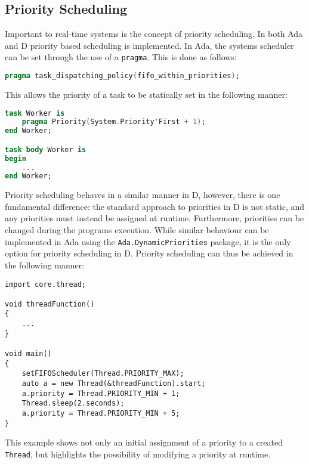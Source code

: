 \subsection{Priority Scheduling}
Important to real-time systems is the concept of priority scheduling. In both
Ada and D priority based scheduling is implemented. In Ada, the systems scheduler can
be set through the use of a \texttt{pragma}. This is done as follows: 
\begin{lstlisting}[basicstyle=\small,language=Ada]
pragma task_dispatching_policy(fifo_within_priorities); 
\end{lstlisting}
This allows the priority of a task to be statically set in the following manner: 
\begin{lstlisting}[basicstyle=\small,language=Ada]
task Worker is 
    pragma Priority(System.Priority'First + 1); 
end Worker;

task body Worker is 
begin 
    ...
end Worker; 
\end{lstlisting}
Priority scheduling behaves in a similar manner in D, however, there is one
fundamental difference: the standard approach to priorities in D is not static, 
and any priorities must instead be assigned at runtime. 
Furthermore, priorities can be changed during the programs execution. While similar
behaviour can be implemented in Ada using the
\texttt{Ada.Dynamic\textunderscore{}Priorities}
package, it is the only option for priority scheduling in D. 
Priority scheduling can thus be achieved in the following manner: 
\begin{lstlisting}[basicstyle=\small]
import core.thread; 

void threadFunction()
{
    ...
}

void main()
{
    setFIFOScheduler(Thread.PRIORITY_MAX);
    auto a = new Thread(&threadFunction).start;
    a.priority = Thread.PRIORITY_MIN + 1; 
    Thread.sleep(2.seconds); 
    a.priority = Thread.PRIORITY_MIN + 5; 
}
\end{lstlisting}
This example shows not only an initial assignment of a priority to a created
\texttt{Thread}, but highlights the possibility of modifying a priority at
runtime. 

